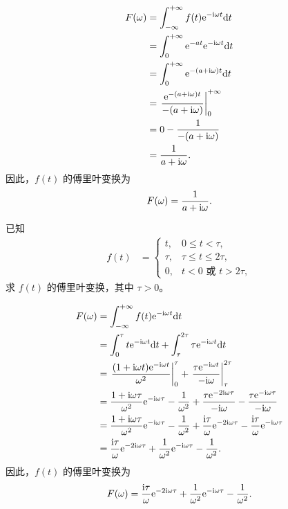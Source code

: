 \begin{solution}
    \begin{align*}
        F(\omega) & = \int_{-\infty}^{+\infty}f(t)\mathrm{e}^{-\mathrm{i}\omega t}\mathrm{d}t \\
        & = \int_{0}^{+\infty}\mathrm{e}^{-at}\mathrm{e}^{-\mathrm{i}\omega t}\mathrm{d}t \\
        & = \int_{0}^{+\infty}\mathrm{e}^{-(a+\mathrm{i}\omega)t}\mathrm{d}t \\
        & = \left.\frac{\mathrm{e}^{-(a+\mathrm{i}\omega)t}}{-(a+\mathrm{i}\omega)}\right|_{0}^{+\infty} \\
        & = 0 - \frac{1}{-(a+\mathrm{i}\omega)} \\
        & = \frac{1}{a+\mathrm{i}\omega}.
    \end{align*}
    因此，$f(t)$ 的傅里叶变换为
    \begin{align*}
        F(\omega) = \frac{1}{a+\mathrm{i}\omega}.
    \end{align*}
\end{solution}

\begin{exercise}
    已知
    \begin{align*}
        f(t) &= \begin{cases}
            t, & 0 \le t < \tau, \\
            \tau, & \tau \le t \le 2\tau, \\
            0, & t < 0 \text{ 或 } t > 2\tau,
        \end{cases}
    \end{align*}
    求 $f(t)$ 的傅里叶变换，其中 $\tau > 0$。
\end{exercise}

\begin{solution}
    \begin{align*}
        F(\omega) & = \int_{-\infty}^{+\infty}f(t)\mathrm{e}^{-\mathrm{i}\omega t}\mathrm{d}t \\
        & = \int_{0}^{\tau}t\mathrm{e}^{-\mathrm{i}\omega t}\mathrm{d}t + \int_{\tau}^{2\tau}\tau\mathrm{e}^{-\mathrm{i}\omega t}\mathrm{d}t \\
        & = \left.\frac{(1 +\mathrm{i}\omega t)\mathrm{e}^{-\mathrm{i}\omega t}}{\omega^2}\right|_{0}^{\tau} + \left.\frac{\tau\mathrm{e}^{-\mathrm{i}\omega t}}{-\mathrm{i}\omega}\right|_{\tau}^{2\tau} \\
        & = \frac{1 + \mathrm{i}\omega\tau}{\omega^2}\mathrm{e}^{-\mathrm{i}\omega\tau} - \frac{1}{\omega^2} + \frac{\tau\mathrm{e}^{-2\mathrm{i}\omega\tau}}{-\mathrm{i}\omega} - \frac{\tau\mathrm{e}^{-\mathrm{i}\omega\tau}}{-\mathrm{i}\omega} \\
        & = \frac{1 + \mathrm{i}\omega\tau}{\omega^2}\mathrm{e}^{-\mathrm{i}\omega\tau} - \frac{1}{\omega^2} + \frac{\mathrm{i}\tau}{\omega}\mathrm{e}^{-2\mathrm{i}\omega \tau} - \frac{\mathrm{i}\tau}{\omega}\mathrm{e}^{-\mathrm{i} \omega \tau} \\
        & = \frac{\mathrm{i}\tau}{\omega}\mathrm{e}^{-2\mathrm{i}\omega\tau} + \frac{1}{\omega^2}\mathrm{e}^{-\mathrm{i}\omega\tau} - \frac{1}{\omega^2}.
    \end{align*}
    因此，$f(t)$ 的傅里叶变换为
    \begin{align*}
        F(\omega) = \frac{\mathrm{i}\tau}{\omega}\mathrm{e}^{-2\mathrm{i}\omega\tau} + \frac{1}{\omega^2}\mathrm{e}^{-\mathrm{i}\omega\tau} - \frac{1}{\omega^2}.
    \end{align*}
\end{solution}
